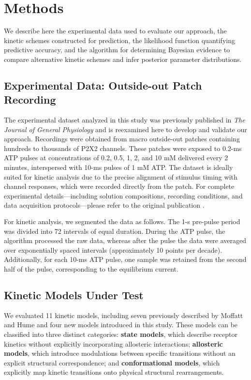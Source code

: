\documentclass[pdflatex,sn-nature]{sn-jnl}%
\theoremstyle{thmstyleone}%
\theoremstyle{thmstyletwo}%
\theoremstyle{thmstylethree}%
\begin{document}
\section{Methods}\label{sec:methods}


We describe here the experimental data used to evaluate our approach, the kinetic schemes constructed for prediction, the likelihood function quantifying predictive accuracy, and the algorithm for determining Bayesian evidence to compare alternative kinetic schemes and infer posterior parameter distributions.

\subsection{Experimental Data: Outside-out Patch Recording}

The experimental dataset analyzed in this study was previously published in \textit{The Journal of General Physiology} \cite{Moffatt_hume} and is reexamined here to develop and validate our approach. Recordings were obtained from macro outside-out patches containing hundreds to thousands of P2X2 channels. These patches were exposed to 0.2-ms ATP pulses at concentrations of 0.2, 0.5, 1, 2, and 10 mM delivered every 2 minutes, interspersed with 10-ms pulses of 1 mM ATP. The dataset is ideally suited for kinetic analysis due to the precise alignment of stimulus timing with channel responses, which were recorded directly from the patch. For complete experimental details—including solution compositions, recording conditions, and data acquisition protocols—please refer to the original publication \cite{Moffatt_hume}.

For kinetic analysis, we segmented the data as follows. The 1-s pre-pulse period was divided into 72 intervals of equal duration. During the ATP pulse, the algorithm processed the raw data, whereas after the pulse the data were averaged over exponentially spaced intervals (approximately 10 points per decade). Additionally, for each 10-ms ATP pulse, one sample was retained from the second half of the pulse, corresponding to the equilibrium current.

\subsection{Kinetic Models Under Test}

We evaluated 11 kinetic models, including seven previously described by Moffatt and Hume \cite{Moffatt_hume} and four new models introduced in this study. These models can be classified  into three distinct categories: \textbf{state models}, which describe receptor kinetics without explicitly incorporating allosteric interactions; \textbf{allosteric models}, which introduce modulations between specific transitions without an explicit structural correspondence; and \textbf{conformational models}, which explicitly map kinetic transitions onto physical structural rearrangements.
\end{document}
